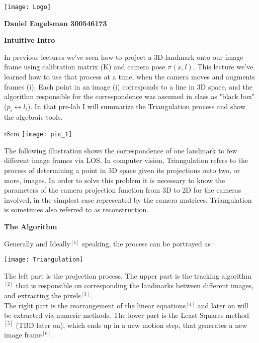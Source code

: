 \documentclass[12pt]{article}
\begin{document}
\onehalfspacing
\texttt{[image: Logo]} \\
\begin{center}
\textbf{Daniel Engelsman 300546173}
\end{center} 


\textbf{{\Large Intuitive Intro}} \begin{flushleft}
In previous lectures we've seen how to project a 3D landmark onto our image frame using calibration matrix (K) and camera pose $\pi(x,l)$. This lecture we've learned how to use that process at a time, when the camera moves and augments frames (i). Each point in an image (i) corresponds to a line in 3D space, and the algorithm responsible for the correspondence was assumed in class as "black box" ($p_i \leftrightarrow l_i$). In that pre-lab I will summarize the Triangulation process and show the algebraic tools.
\end{flushleft}


\begin{wrapfigure}{r}{8cm}
\texttt{[image: pic\_1]} 
\end{wrapfigure}
The following illustration shows the correspondence of one landmark to few different image frames via LOS. 
In computer vision, Triangulation refers to the process of determining a point in 3D space given its projections onto two, or more, images. In order to solve this problem it is necessary to know the parameters of the camera projection function from 3D to 2D for the cameras involved, in the simplest case represented by the camera matrices. Triangulation is sometimes also referred to as reconstruction.\newpage

\textbf{{\Large The Algorithm}}

Generally and Ideally$^{[1]}$ speaking, the process can be portrayed as :
\begin{flushleft}
\texttt{[image: Triangulation]} 
\end{flushleft}

\begin{flushleft}
The left part is the projection process. The upper part is the tracking algorithm$^{[2]}$ that is responsible on corresponding the landmarks between different images, and extracting the pixels$^{[3]}$.\\
The right part is the rearrangement of the linear equations$^{[4]}$ and later on will be extracted via numeric methods. The lower part is the Least Squares method$^{[5]}$ (TBD later on), which ends up in a new motion step, that generates a new image frame$^{[6]}$.
\end{flushleft}
\end{document}
